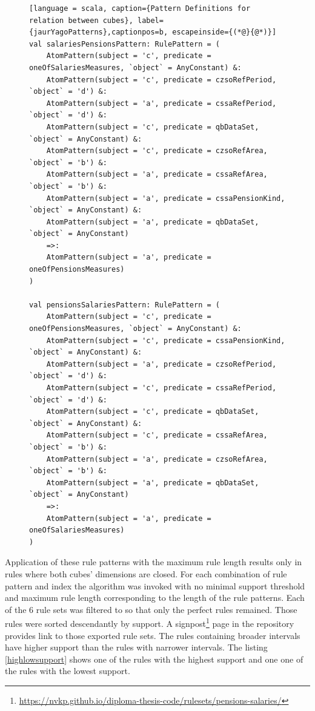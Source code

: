 \begin{figure}[h]
\begin{lstlisting}[language = scala, caption={Pattern Definitions for relation between cubes}, label={jaurYagoPatterns},captionpos=b, escapeinside={(*@}{@*)}]
val salariesPensionsPattern: RulePattern = (
    AtomPattern(subject = 'c', predicate = oneOfSalariesMeasures, `object` = AnyConstant) &:
    AtomPattern(subject = 'c', predicate = czsoRefPeriod, `object` = 'd') &:
    AtomPattern(subject = 'a', predicate = cssaRefPeriod, `object` = 'd') &:
    AtomPattern(subject = 'c', predicate = qbDataSet, `object` = AnyConstant) &:
    AtomPattern(subject = 'c', predicate = czsoRefArea, `object` = 'b') &:
    AtomPattern(subject = 'a', predicate = cssaRefArea, `object` = 'b') &:
    AtomPattern(subject = 'a', predicate = cssaPensionKind, `object` = AnyConstant) &:
    AtomPattern(subject = 'a', predicate = qbDataSet, `object` = AnyConstant)
    =>:
    AtomPattern(subject = 'a', predicate = oneOfPensionsMeasures)
)

val pensionsSalariesPattern: RulePattern = (
    AtomPattern(subject = 'c', predicate = oneOfPensionsMeasures, `object` = AnyConstant) &:
    AtomPattern(subject = 'c', predicate = cssaPensionKind, `object` = AnyConstant) &:
    AtomPattern(subject = 'a', predicate = czsoRefPeriod, `object` = 'd') &:
    AtomPattern(subject = 'c', predicate = cssaRefPeriod, `object` = 'd') &:
    AtomPattern(subject = 'c', predicate = qbDataSet, `object` = AnyConstant) &:
    AtomPattern(subject = 'c', predicate = cssaRefArea, `object` = 'b') &:
    AtomPattern(subject = 'a', predicate = czsoRefArea, `object` = 'b') &:
    AtomPattern(subject = 'a', predicate = qbDataSet, `object` = AnyConstant)
    =>:
    AtomPattern(subject = 'a', predicate = oneOfSalariesMeasures)
)
\end{lstlisting}
\end{figure}

Application of these rule patterns with the maximum rule length results only in rules where both cubes' dimensions are closed. For each combination of rule pattern and index the algorithm was invoked with no minimal support threshold and maximum rule length corresponding to the length of the rule patterns. Each of the 6 rule sets was filtered to so that only the perfect rules remained. Those rules were sorted descendantly by support. A signpost\footnote{\href{https://nvkp.github.io/diploma-thesis-code/rulesets/pensions-salaries/}{https://nvkp.github.io/diploma-thesis-code/rulesets/pensions-salaries/}} page in the repository provides link to those exported rule sets. The rules containing broader intervals have higher support than the rules with narrower intervals. The listing \ref{highlowsupport} shows one of the rules with the highest support and one one of the rules with the lowest support.

